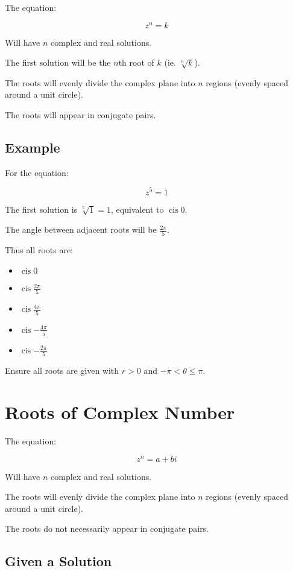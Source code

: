 \documentclass[a4paper,11pt]{article}
\DeclareMathOperator\cis{cis}
\begin{document}
The equation:

$$
z^n = k
$$

Will have $n$ complex and real solutions.

The first solution will be the $n$th root of $k$ (ie. $\sqrt[n]{k}$).

The roots will evenly divide the complex plane into $n$ regions (evenly spaced
around a unit circle).

The roots will appear in conjugate pairs.


\subsection{Example}

For the equation:

$$
z^5 = 1
$$

The first solution is $\sqrt[5]{1} = 1$, equivalent to $\cis{0}$.

The angle between adjacent roots will be $\frac{2\pi}{5}$.

Thus all roots are:

\begin{itemize}
\item $\cis{0}$
\item $\cis{\frac{2\pi}{5}}$
\item $\cis{\frac{4\pi}{5}}$
\item $\cis{-\frac{4\pi}{5}}$
\item $\cis{-\frac{2\pi}{5}}$
\end{itemize}

Ensure all roots are given with $r > 0$ and $-\pi < \theta \leq \pi$.




\section{Roots of Complex Number}

The equation:

$$
z^n = a + bi
$$

Will have $n$ complex and real solutions.

The roots will evenly divide the complex plane into $n$ regions (evenly spaced
around a unit circle).

The roots do not necessarily appear in conjugate pairs.


\subsection{Given a Solution}
\end{document}
